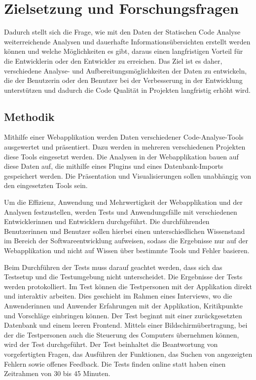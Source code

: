 \section{Zielsetzung und Forschungsfragen}

Dadurch stellt sich die Frage, wie mit den Daten der Statischen Code Analyse weiterreichende Analysen und dauerhafte Informationsübersichten erstellt werden können und welche Möglichkeiten es gibt, daraus einen langfristigen Vorteil für die Entwicklerin oder den Entwickler zu erreichen. Das Ziel ist es daher, verschiedene Analyse- und Aufbereitungsmöglichkeiten der Daten zu entwickeln, die der Benutzerin oder den Benutzer bei der Verbesserung in der Entwicklung unterstützen und dadurch die Code Qualität in Projekten langfristig erhöht wird.

\subsection{Methodik} 

Mithilfe einer Webapplikation werden Daten verschiedener Code-Analyse-Tools ausgewertet und präsentiert. Dazu werden in mehreren verschiedenen Projekten diese Tools eingesetzt werden. Die Analysen in der Webapplikation bauen auf diese Daten auf, die mithilfe eines Plugins und eines Datenbank-Imports gespeichert werden. Die Präsentation und Visualisierungen sollen unabhängig von den eingesetzten Tools sein.

Um die Effizienz, Anwendung und Mehrwertigkeit der Webapplikation und der Analysen festzustellen, werden Tests und Anwendungsfälle mit verschiedenen Entwicklerinnen und Entwicklern durchgeführt. Die durchführenden Benutzerinnen und Benutzer sollen hierbei einen unterschiedlichen Wissenstand im Bereich der Softwareentwicklung aufweisen, sodass die Ergebnisse nur auf der Webapplikation und nicht auf Wissen über bestimmte Tools und Fehler basieren. 


Beim Durchführen der Tests muss darauf geachtet werden, dass sich das Testsetup und die Testumgebung nicht unterscheidet. Die Ergebnisse der Tests werden protokolliert. Im Test können die Testpersonen mit der Applikation direkt und interaktiv arbeiten. Dies geschieht im Rahmen eines Interviews, wo die Anwenderinnen und Anwender Erfahrungen mit der Applikation, Kritikpunkte und Vorschläge einbringen können. Der Test beginnt mit einer zurückgesetzten Datenbank und einem leeren Frontend. Mittels einer Bildschirmübertragung, bei der die Testpersonen auch die Steuerung des Computers übernehmen können, wird der Test durchgeführt.
Der Test beinhaltet die Beantwortung von vorgefertigten Fragen, das Ausführen der Funktionen, das Suchen von angezeigten Fehlern sowie offenes Feedback.
Die Tests finden online statt haben einen Zeitrahmen von 30 bis 45 Minuten. 
